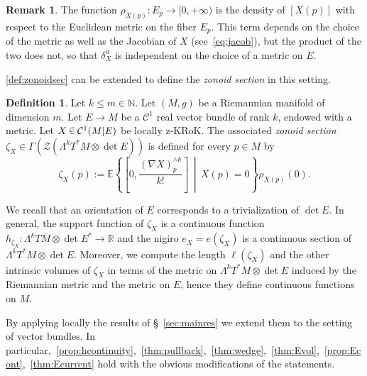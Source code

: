\documentclass[10pt]{amsart}
\theoremstyle{definition}\newtheorem{defi}[theo]{Definition}\newtheorem{rema}[theo]{Remark}\newtheorem{exam}[theo]{Example}\newtheorem{exem}[theo]{Example}\newtheorem{nota}[theo]{Notation}
\newcommand{\R}{\mathbb{R}}
\newcommand{\N}{\mathbb{N}}
\newcommand{\EE}{\mathbb{E}}
\newcommand{\ZZ}{\mathscr{Z}}
\newcommand{\mC}{\mathcal{C}}
\renewcommand{\a}{\alpha}
\newcommand*\randin{
\mathchoice {\raisebox{-.35ex}{$\displaystyle{^\subset}$}\mkern-11.5mu\raisebox{+.45ex}{$\displaystyle{_\subset}$}} {\mkern+1mu\raisebox{-.27ex}{$\textstyle{^\subset}$}\mkern-11.7mu\raisebox{+.45ex}{$\textstyle{_\subset}$}} {\raisebox{.35ex}{$\scriptstyle\subset$}\mkern-14mu\raisebox{-.15ex}{$\scriptstyle\subset$}} {\raisebox{.3ex}{$\scriptscriptstyle\subset$}\mkern-13.5mu\raisebox{-.10ex}{$\scriptscriptstyle\subset$}}}
\begin{document}
\begin{rema}
The function $\rho_{X(p)}\colon E_p\to [0,+\infty)$ is the density of $[X(p)]$ with respect to the Euclidean metric on the fiber $E_p$. This term depends on the choice of the metric as well as the Jacobian of $X$ (see~\eqref{eq:jacob}), but the product of the two does not, so that $\delta^\a_X$ is independent on the choice of a metric on $E$.
\end{rema}
\cref{def:zonoidsec} can be extended to define the \emph{zonoid section} in this setting.

\begin{defi}\label{def:zonoidsecvb}
Let $k\le m\in \N$. Let $(M,g)$ be a Riemannian manifold of dimension $m$. Let $E\to M$ be a $\mC^1$ real vector bundle of rank $k$, endowed with a metric. Let $X\,\randin\, \mC^1(M|E)$ be locally z-KRoK. The associated \emph{zonoid section} $\zeta_X\in \Gamma(\ZZ(\Lambda^k T^*M\otimes \det E))$ is defined for every $p\in M$ by
\begin{equation*}
\zeta_X(p):=\EE\left\{\left[0,\frac{(\nabla X)^{\wedge k}_p}{k!}\right]\,\middle|\,X(p)=0\right\}\rho_{X(p)}(0).
\end{equation*}
\end{defi}

We recall that an orientation of $E$ corresponds to a trivialization of $\det E$. In general, the support function of $\zeta_X$ is a continuous function $h_{\zeta_X}\colon \Lambda^k TM\otimes \det E^*\to \R$ and the nigiro $e_X=e(\zeta_X)$ is a continuous section of $\Lambda^k T^*M\otimes \det E$. Moreover, we compute the length $\ell(\zeta_X)$ and the other intrinsic volumes of $\zeta_X$ in terms of the metric on $\Lambda^kT^*M\otimes \det E$ induced by the Riemannian metric and the metric on $E$, hence they define continuous functions on $M$.

By applying locally the results of \S~\ref{sec:mainres} we extend them to the setting of vector bundles. In particular,~\cref{prop:hcontinuity},~\cref{thm:pullback},~\cref{thm:wedge},~\cref{thm:Evol},~\cref{prop:Econt},~\cref{thm:Ecurrent} hold with the obvious modifications of the statements.
\end{document}

